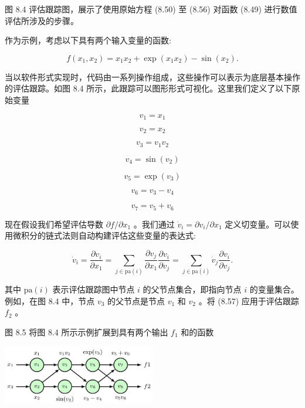 \documentclass[10pt]{report}
\begin{document}
图 8.4 评估跟踪图，展示了使用原始方程 (8.50) 至 (8.56) 对函数 (8.49) 进行数值评估所涉及的步骤。

作为示例，考虑以下具有两个输入变量的函数:

\[
f\left( {{x}_{1},{x}_{2}}\right)  = {x}_{1}{x}_{2} + \exp \left( {{x}_{1}{x}_{2}}\right)  - \sin \left( {x}_{2}\right) . \tag{8.49}
\]

当以软件形式实现时，代码由一系列操作组成，这些操作可以表示为底层基本操作的评估跟踪。如图 8.4 所示，此跟踪可以图形形式可视化。这里我们定义了以下原始变量

\[
{v}_{1} = {x}_{1} \tag{8.50}
\]

\[
{v}_{2} = {x}_{2} \tag{8.51}
\]

\[
{v}_{3} = {v}_{1}{v}_{2} \tag{8.52}
\]

\[
{v}_{4} = \sin \left( {v}_{2}\right)  \tag{8.53}
\]

\[
{v}_{5} = \exp \left( {v}_{3}\right)  \tag{8.54}
\]

\[
{v}_{6} = {v}_{3} - {v}_{4} \tag{8.55}
\]

\[
{v}_{7} = {v}_{5} + {v}_{6} \tag{8.56}
\]

现在假设我们希望评估导数 \(\partial f/\partial {x}_{1}\) 。我们通过 \({\dot{v}}_{i} = \partial {v}_{i}/\partial {x}_{1}\) 定义切变量。可以使用微积分的链式法则自动构建评估这些变量的表达式:

\[
{\dot{v}}_{i} = \frac{\partial {v}_{i}}{\partial {x}_{1}} = \mathop{\sum }\limits_{{j \in  \mathrm{{pa}}\left( i\right) }}\frac{\partial {v}_{j}}{\partial {x}_{1}}\frac{\partial {v}_{i}}{\partial {v}_{j}} = \mathop{\sum }\limits_{{j \in  \mathrm{{pa}}\left( i\right) }}{\dot{v}}_{j}\frac{\partial {v}_{i}}{\partial {v}_{j}}. \tag{8.57}
\]

其中 \(\mathrm{{pa}}\left( i\right)\) 表示评估跟踪图中节点 \(i\) 的父节点集合，即指向节点 \(i\) 的变量集合。例如，在图 8.4 中，节点 \({v}_{3}\) 的父节点是节点 \({v}_{1}\) 和 \({v}_{2}\) 。将 (8.57) 应用于评估跟踪 \({f}_{2}\) 。

图 8.5 将图 8.4 所示示例扩展到具有两个输出 \({f}_{1}\) 和的函数

\begin{center}
\includegraphics[max width=0.5\textwidth]{images/0194e279-9b28-703a-88f4-c3ac21e2010d_267_857_354_688_267_0.jpg}
\end{center}
\hspace*{3em} 
\end{document}
